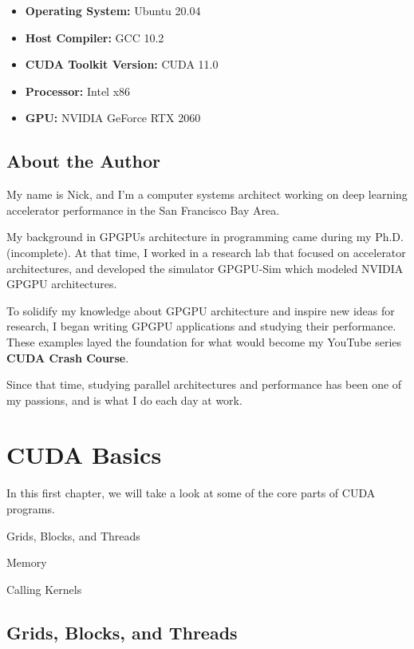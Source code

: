 \documentclass[11pt,fancy,authoryear]{elegantbook}
\begin{document}
\begin{itemize}
  \item \textbf{Operating System: } Ubuntu 20.04
  \item \textbf{Host Compiler: } GCC 10.2
  \item \textbf{CUDA Toolkit Version: } CUDA 11.0
  \item \textbf{Processor: } Intel x86
  \item \textbf{GPU: } NVIDIA GeForce RTX 2060
\end{itemize}

\section{About the Author}

My name is Nick, and I'm a computer systems architect working on deep learning accelerator performance in the San Francisco Bay Area.

My background in GPGPUs architecture in programming came during my Ph.D. (incomplete). At that time, I worked in a research lab that focused on accelerator architectures, and developed the simulator GPGPU-Sim which modeled NVIDIA GPGPU architectures.

To solidify my knowledge about GPGPU architecture and inspire new ideas for research, I began writing GPGPU applications and studying their performance. These examples layed the foundation for what would become my YouTube series \textbf{CUDA Crash Course}.

Since that time, studying parallel architectures and performance has been one of my passions, and is what I do each day at work.

\chapter{CUDA Basics}

In this first chapter, we will take a look at some of the core parts of CUDA programs.

\begin{introduction}
  \item Grids, Blocks, and Threads
  \item Memory
  \item Calling Kernels
\end{introduction}

\section{Grids, Blocks, and Threads}
\end{document}
